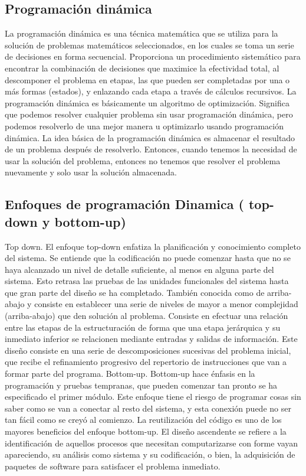 \documentclass[12pt,twoside]{article}
\begin{document}
\subsection{Programación dinámica}
La programación dinámica es una técnica matemática que
se utiliza para la solución de problemas matemáticos
seleccionados, en los cuales se toma un serie de decisiones en forma secuencial.
Proporciona un procedimiento sistemático para encontrar la combinación de decisiones que maximice la efectividad total, al descomponer el problema en etapas, las que pueden ser completadas por una o más formas (estados), y enlazando cada etapa a través de cálculos recursivos.
La programación dinámica es básicamente un algoritmo de optimización. Significa que podemos resolver cualquier problema sin usar programación dinámica, pero podemos resolverlo de una mejor manera u optimizarlo usando programación dinámica.
La idea básica de la programación dinámica es almacenar el resultado de un problema después de resolverlo. Entonces, cuando tenemos la necesidad de usar la solución del problema, entonces no tenemos que resolver el problema nuevamente y solo usar la solución almacenada.
\subsection{Enfoques de programación Dinamica ( top-down y bottom-up)}\newline
Top down. \newline
El enfoque top-down enfatiza la planificación y conocimiento completo del sistema. Se entiende que la codificación no puede comenzar hasta que no se haya alcanzado un nivel de detalle suficiente, al menos en alguna parte del sistema. Esto retrasa las pruebas de las unidades funcionales del sistema hasta que gran parte del diseño se ha completado.
También conocida como de arriba-abajo y consiste en establecer una serie de niveles de mayor a menor complejidad (arriba-abajo) que den solución al problema. Consiste en efectuar una relación entre las etapas de la estructuración de forma que una etapa jerárquica y su inmediato inferior se relacionen mediante entradas y salidas de información. Este diseño consiste en una serie de descomposiciones sucesivas del problema inicial, que recibe el refinamiento progresivo del repertorio de instrucciones que van a formar parte del programa.\newline
Bottom-up. \newline
Bottom-up hace énfasis en la programación y pruebas tempranas, que pueden comenzar tan pronto se ha especificado el primer módulo. Este enfoque tiene el riesgo de programar cosas sin saber como se van a conectar al resto del sistema, y esta conexión puede no ser tan fácil como se creyó al comienzo. La reutilización del código es uno de los mayores beneficios del enfoque bottom-up.
El diseño ascendente se refiere a la identificación de aquellos procesos que necesitan computarizarse con forme vayan apareciendo, su análisis como sistema y su codificación, o bien, la adquisición de paquetes de software para satisfacer el problema inmediato.
\end{document}
